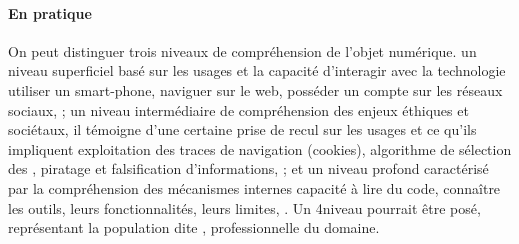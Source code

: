     \paragraph{En pratique}
        On peut distinguer trois niveaux de compréhension de l'objet numérique.
        \Li un niveau superficiel basé sur les usages et la capacité d'interagir avec la technologie \eg utiliser un smart-phone, naviguer sur le web, posséder un compte sur les réseaux sociaux, \etc; \ii un niveau intermédiaire de compréhension des enjeux éthiques et sociétaux, il témoigne d'une certaine prise de recul sur les usages et ce qu'ils impliquent \eg exploitation des traces de navigation (cookies), algorithme de sélection des , piratage et falsification d'informations, \etc; et \iii un niveau profond caractérisé par la compréhension des mécanismes internes \eg capacité à lire du code, connaître les outils, leurs fonctionnalités, leurs limites, \etc. Un 4\ieme niveau pourrait être posé, représentant la population dite , professionnelle du domaine.\nocite{atlan2019apprentissage}